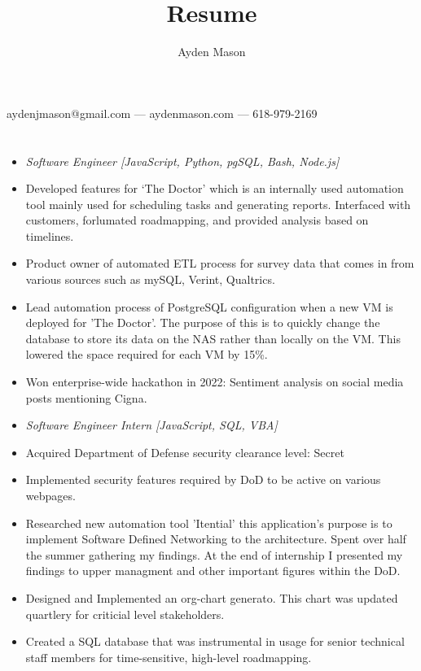 \documentclass{article}
\makeatletter
\renewcommand{\maketitle}{

\begin{center}
{\huge\bfseries
\theauthor}


aydenjmason@gmail.com --- aydenmason.com --- 618-979-2169
\end{center}
}
\makeatother
\begin{document}
\bgroup\obeylines
\title{Resume}
\author{Ayden Mason}

\maketitle
\section{}
\begin{itemize}
\subsection{Cigna\hfill\mdseries July 2021 - Present}


 \item[] \textit{Software Engineer [JavaScript, Python, pgSQL, Bash, Node.js]}
\item Developed features for ‘The Doctor’ which is an internally used automation tool mainly used for scheduling tasks and generating reports. Interfaced with customers, forlumated roadmapping, and provided analysis based on timelines.
\item Product owner of automated ETL process for survey data that comes in from various sources such as mySQL, Verint, Qualtrics.  
\item Lead automation process of PostgreSQL configuration when a new VM is deployed for 'The Doctor'. The  purpose of this is to quickly change the database to store its data on the NAS rather than locally on the VM. This lowered the space required for each VM by 15\%.
\item Won enterprise-wide hackathon in 2022: Sentiment analysis on social media posts mentioning Cigna.\\
\end{itemize}
\begin{itemize}
\subsection*{Leidos\hfill\mdseries Summer 2019/2020}
\item[] \textit{Software Engineer Intern [JavaScript, SQL, VBA]}
\item Acquired Department of Defense security clearance level: Secret
\item Implemented security features required by DoD to be active on various webpages.
\item Researched new automation tool 'Itential' this application's purpose is to implement Software Defined Networking to the architecture. Spent over half the summer gathering my findings. At the end of internship I presented my findings to upper managment and other important figures within the DoD.
\item Designed and Implemented an org-chart generato. This chart was updated quartlery for criticial level stakeholders.
\item Created a SQL database that was instrumental in usage for senior technical staff members for time-sensitive, high-level roadmapping.
\end{itemize}
\end{document}
